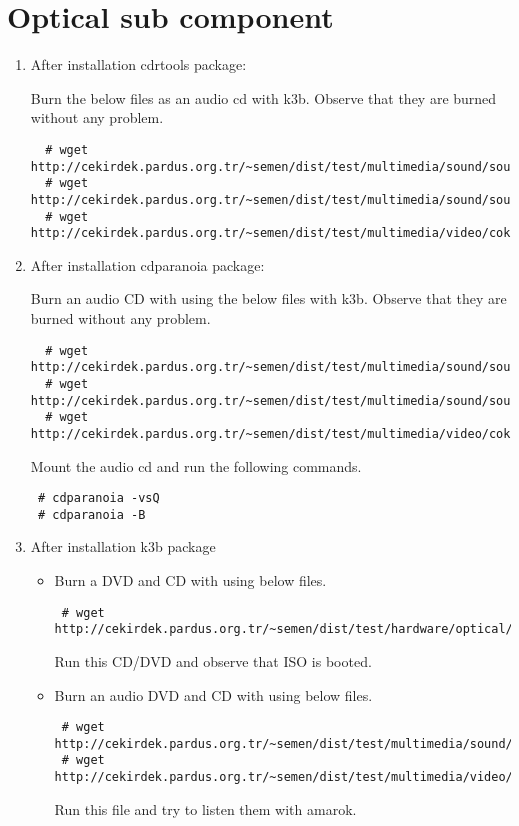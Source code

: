 \documentclass[a4paper,10pt]{article}
\begin{document}
\section{Optical sub component}
\begin{enumerate}
 \item After installation cdrtools package:

Burn the below files as an audio cd with k3b. Observe that they are burned without any problem.
 \begin{verbatim}
  # wget http://cekirdek.pardus.org.tr/~semen/dist/test/multimedia/sound/sound/11k16bitpcm.wav
  # wget http://cekirdek.pardus.org.tr/~semen/dist/test/multimedia/sound/sound/music.mp3
  # wget http://cekirdek.pardus.org.tr/~semen/dist/test/multimedia/video/cokluortam/linux.ogg
 \end{verbatim}

 \item After installation cdparanoia package:

Burn an audio CD with using the below files with k3b. Observe that they are burned without any problem.
 \begin{verbatim}
  # wget http://cekirdek.pardus.org.tr/~semen/dist/test/multimedia/sound/sound/11k16bitpcm.wav
  # wget http://cekirdek.pardus.org.tr/~semen/dist/test/multimedia/sound/sound/music.mp3
  # wget http://cekirdek.pardus.org.tr/~semen/dist/test/multimedia/video/cokluortam/linux.ogg
 \end{verbatim}

Mount the audio cd and run the following commands.
\begin{verbatim}
 # cdparanoia -vsQ
 # cdparanoia -B
\end{verbatim}

\item After installation k3b package
\begin{itemize}
\item Burn a DVD and CD with using below files.
\begin{verbatim}
 # wget http://cekirdek.pardus.org.tr/~semen/dist/test/hardware/optical/boot.iso
\end{verbatim}

Run this CD/DVD and observe that ISO is booted.

\item Burn an audio DVD and CD with using below files. 
\begin{verbatim}
 # wget http://cekirdek.pardus.org.tr/~semen/dist/test/multimedia/sound/sound.tar
 # wget http://cekirdek.pardus.org.tr/~semen/dist/test/multimedia/video/cokluortam.tar
\end{verbatim}

Run this file and try to listen them with amarok.

\end{itemize}

\end{enumerate}
\end{document}
